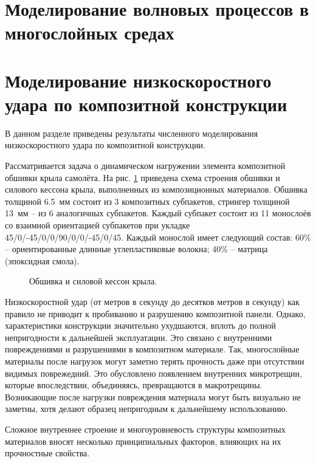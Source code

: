 \section{Моделирование волновых процессов в многослойных средах}


\clearpage
\newpage

\section{Моделирование низкоскоростного удара по композитной конструкции}

В данном разделе приведены результаты численного моделирования низкоскоростного
удара по композитной конструкции.

Рассматривается задача о динамическом нагружении элемента композитной обшивки крыла самолёта. На рис.
\ref{pic:construction} приведена схема строения обшивки и силового кессона
крыла, выполненных из композиционных материалов. Обшивка толщиной 6.5~мм состоит 
из 3 композитных субпакетов, стрингер толщиной 13~мм -- из 6 аналогичных субпакетов. Каждый субпакет
состоит из 11 монослоёв со взаимной ориентацией субпакетов при укладке 
45/0/-45/0/0/90/0/0/-45/0/45. Каждый монослой имеет следующий состав: 60\% -- 
ориентированные длинные углепластиковые волокна; 40\% -- матрица
(эпоксидная смола). 

\begin{figure}[h]
\caption{Обшивка и силовой кессон крыла.}
\label{pic:construction}
\end{figure}

Низкоскоростной удар (от метров в секунду до десятков метров в секунду) 
как правило не приводит к пробиванию и разрушению композитной панели. Однако, 
характеристики конструкции значительно ухудшаются, вплоть до полной непригодности к 
дальнейшей эксплуатации. Это связано с внутренними повреждениями и разрушениями 
в композитном материале. Так, многослойные материалы после нагрузок могут заметно 
терять прочность даже при отсутствии видимых поврежедний.
Это обусловлено появлением внутренних микротрещин, которые впоследствии, объединяясь,
превращаются в макротрещины. Возникающие после нагрузки повреждения
материала могут быть визуально не заметны, хотя делают образец непригодным к
дальнейшему использованию.

Сложное внутреннее строение и многоуровневость структуры композитных материалов вносят несколько 
принципиальных факторов, влияющих на их прочностные свойства.

